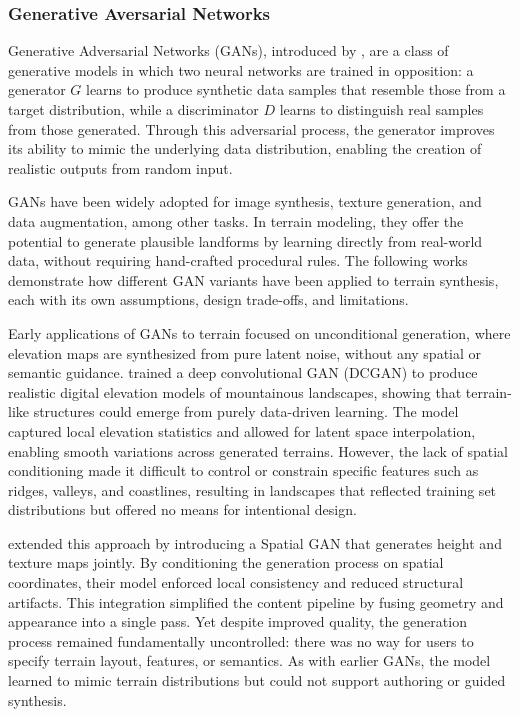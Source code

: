 \subsubsection{Generative Aversarial Networks}
\label{sec:coral-island_sota-GAN}

Generative Adversarial Networks (GANs), introduced by \cite{Goodfellow2014}, are a class of generative models in which two neural networks are trained in opposition: a generator $G$ learns to produce synthetic data samples that resemble those from a target distribution, while a discriminator $D$ learns to distinguish real samples from those generated. Through this adversarial process, the generator improves its ability to mimic the underlying data distribution, enabling the creation of realistic outputs from random input.

GANs have been widely adopted for image synthesis, texture generation, and data augmentation, among other tasks. In terrain modeling, they offer the potential to generate plausible landforms by learning directly from real-world data, without requiring hand-crafted procedural rules. The following works demonstrate how different GAN variants have been applied to terrain synthesis, each with its own assumptions, design trade-offs, and limitations.



Early applications of GANs to terrain focused on unconditional generation, where elevation maps are synthesized from pure latent noise, without any spatial or semantic guidance. \citep{WulffJensen2018} trained a deep convolutional GAN (DCGAN) to produce realistic digital elevation models of mountainous landscapes, showing that terrain-like structures could emerge from purely data-driven learning. The model captured local elevation statistics and allowed for latent space interpolation, enabling smooth variations across generated terrains. However, the lack of spatial conditioning made it difficult to control or constrain specific features such as ridges, valleys, and coastlines, resulting in landscapes that reflected training set distributions but offered no means for intentional design.

\citep{Spick2019} extended this approach by introducing a Spatial GAN that generates height and texture maps jointly. By conditioning the generation process on spatial coordinates, their model enforced local consistency and reduced structural artifacts. This integration simplified the content pipeline by fusing geometry and appearance into a single pass. Yet despite improved quality, the generation process remained fundamentally uncontrolled: there was no way for users to specify terrain layout, features, or semantics. As with earlier GANs, the model learned to mimic terrain distributions but could not support authoring or guided synthesis.

